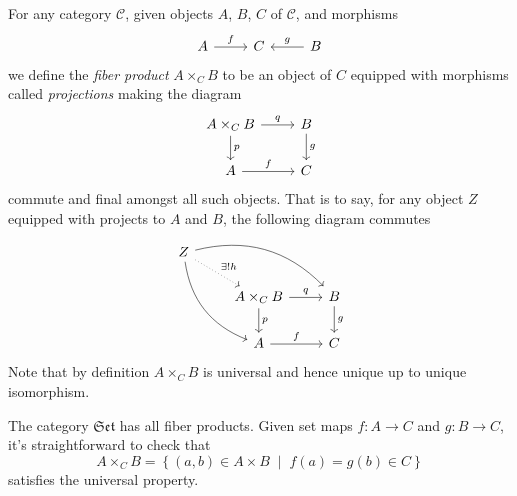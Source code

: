 \documentclass[10pt]{amsart}
\begin{document}
\begin{defn}
  For any category $\mathscr{C}$, given objects $A$, $B$, $C$ of $\mathscr{C}$, and morphisms
  $$\begin{tikzcd}
    A \arrow{r}{f} & C & \arrow[swap]{l}{g} B
  \end{tikzcd}$$
  we define the {\em fiber product} $A \times_C B$ to be an object of $C$ equipped with morphisms called {\em projections} making the diagram
  $$\begin{tikzcd}
    A \times_C B \arrow{d}{p} \arrow{r}{q} & B\arrow{d}{g}\\
    A\arrow{r}{f} & C
  \end{tikzcd}$$
  commute and final amongst all such objects.
  That is to say, for any object $Z$ equipped with projects to $A$ and $B$, the following diagram commutes
  $$\begin{tikzcd}
    Z\arrow[bend right]{ddr}\arrow[bend left]{rrd} \arrow[dotted]{rd}{\exists ! h}& &\\
    & A \times_C B \arrow{r}{q}\arrow{d}{p} & B\arrow{d}{g}\\
    & A\arrow{r}{f} & C
  \end{tikzcd}$$
  Note that by definition $A \times_C B$ is universal and hence unique up to unique isomorphism.
\end{defn}

The category $\mathfrak{Set}$ has all fiber products.  Given set maps $f: A \rightarrow C$ and $g : B \rightarrow C$, it's straightforward to check that
$$A \times_C B = \left\{(a,b) \in A \times B \;\middle\vert\; f(a) = g(b) \in C\right\}$$
satisfies the universal property.
\end{document}
